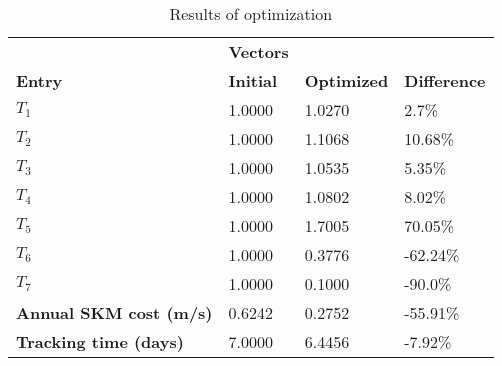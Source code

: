 \begin{table}[H]
\centering
\begin{tabular}{llll}
\textbf{}      & \cellcolor[HTML]{EFEFEF}\textbf{Vectors} & \textbf{} & \textbf{}         \\
\rowcolor[HTML]{EFEFEF} 
\textbf{Entry} & \textbf{Initial} & \textbf{Optimized} & \textbf{Difference} \\
$T_1$ & 1.0000 & 1.0270 & 2.7\% \\ 
$T_2$ & 1.0000 & 1.1068 & 10.68\% \\ 
$T_3$ & 1.0000 & 1.0535 & 5.35\% \\ 
$T_4$ & 1.0000 & 1.0802 & 8.02\% \\ 
$T_5$ & 1.0000 & 1.7005 & 70.05\% \\ 
$T_6$ & 1.0000 & 0.3776 & -62.24\% \\ 
$T_7$ & 1.0000 & 0.1000 & -90.0\% \\ 
\rowcolor[HTML]{EFEFEF} 
\textbf{Annual SKM cost (m/s)}  & 0.6242 & 0.2752 & -55.91\% \\ 
\rowcolor[HTML]{EFEFEF} 
\textbf{Tracking time (days)}  & 7.0000 & 6.4456 & -7.92\% \\ 
\end{tabular}
\caption{Results of optimization}
\label{tab:OptimizationAnalysis}
\end{table}